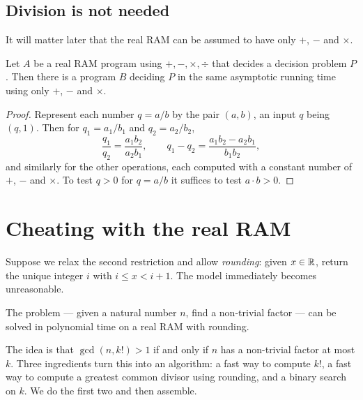 \subsection{Division is not needed}
\label{sec:real-ram-no-division}

It will matter later that the real RAM can be assumed to have only $+$, $-$ and
$\times$.

\begin{lemma}\label{lem:real-ram-no-division}
Let $A$ be a real RAM program using $+,-,\times,\div$ that decides a decision
problem $P$. Then there is a program $B$ deciding $P$ in the same asymptotic
running time using only $+$, $-$ and $\times$.
\end{lemma}

\begin{proof}
Represent each number $q = a/b$ by the pair $(a,b)$, an input $q$ being
$(q,1)$. Then for $q_1 = a_1/b_1$ and $q_2 = a_2/b_2$,
\[ \frac{q_1}{q_2} = \frac{a_1 b_2}{a_2 b_1}, \qquad
   q_1 - q_2 = \frac{a_1b_2 - a_2b_1}{b_1b_2}, \]
and similarly for the other operations, each computed with a constant number of
$+$, $-$ and $\times$. To test $q > 0$ for $q = a/b$ it suffices to test
$a \cdot b > 0$.
\end{proof}

\section{Cheating with the real RAM}
\label{sec:real-ram-rounding}

Suppose we relax the second restriction and allow \emph{rounding}: given
$x \in \mathbb{R}$, return the unique integer $i$ with $i \le x < i+1$. The model
immediately becomes unreasonable.

\begin{theorem}\label{thm:real-ram-factoring}
The  problem --- given a natural number $n$, find a non-trivial
factor --- can be solved in polynomial time on a real RAM with rounding.
\end{theorem}

The idea is that $\gcd(n, k!) > 1$ if and only if $n$ has a non-trivial factor
at most $k$. Three ingredients turn this into an algorithm: a fast way to
compute $k!$, a fast way to compute a greatest common divisor using rounding,
and a binary search on $k$. We do the first two and then assemble.

